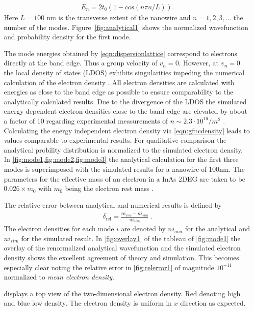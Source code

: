 \begin{align}
E_{n} = 2t_0(1-\text{cos}(n\pi a/L)).
\label{eqn:dispersionlattice}
\end{align}
Here $L=100$ nm is the transverse extent of the nanowire and $n=1,2,3,\dotsc$ the number of the modes. Figure~\ref{fig:analytical1} shows the normalized wavefunction and probability density for the first mode.\par
The mode energies obtained by \cref{eqn:dispersionlattice} correspond to electrons directly at the band edge. Thus a group velocity of $v_n=0$. However, at $v_n=0$ the local density of states (LDOS) exhibits singularities \cite{ghasemi:69010R} impeding the numerical calculation of the electron density \cite{Wimmer2009Thesis}.
All electron densities are calculated with energies as close to the band edge as possible to ensure comparability to the analytically calculated results. Due to the divergence of the LDOS the simulated energy dependent electron densities close to the band edge are elevated by about a factor of 10 regarding experimental measurements of $n \sim2.3\cdot 10^{16}/m^2$ \cite{gelfand2006} \cite{JJAP.26.L59}. Calculating the energy independent electron density via \cref{eqn:gfncdensity} leads to values comparable to experimental results. For qualitative comparison the analytical probility distribution is normalized to the simulated electron density.
In \cref{fig:mode1,fig:mode2,fig:mode3} the analytical calculation for the first three modes is superimposed with the simulated results for a nanowire of 100nm. 
The parameters for the effective mass of an electron in a InAs 2DEG are taken to be $0.026\times m_0$ with $m_0$ being the electron rest mass \cite{PhysRev.105.460}.\par
The relative error between analytical and numerical results is defined by
\begin{align}
\delta_{\text{rel}} = \frac{ni_{ana}-ni_{sim}}{ni_{sim}}\ .
\end{align}
The electron densities for each mode $i$ are denoted by $ni_{ana}$ for the analytical and $ni_{sim}$ for the simulated result.
In \cref{fig:overlay1} of the tableau of \cref{fig:mode1} the overlay of the renormalized analytical wavefunction and the simulated electron density shows the excellent agreement of theory and simulation. This becomes especially clear noting the relative error in \cref{fig:relerror1} of magnitude $10^{-11}$ normalized to \emph{mean electron density}.\par
{} displays a top view of the two-dimensional electron density. Red denoting high and blue low density. The electron density is uniform in $x$ direction as expected.\par
